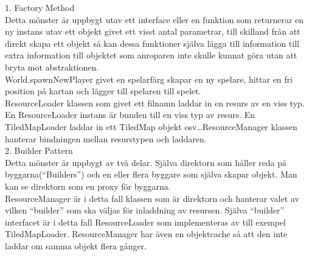 \vspace{11pt}
1. Factory Method\\
Detta mönster är uppbygt utav ett interface eller en funktion som returnerar en ny instans utav ett objekt givet ett visst antal parametrar, till skilland från att direkt skapa ett objekt så kan dessa funktioner själva lägga till information till extra information till objektet som anroparen inte skulle kunnat göra utan att bryta mot abstraktionen.\\
World.spawnNewPlayer givet en spelarfärg skapar en ny spelare, hittar en fri position på kartan och lägger till spelaren till spelet.\\
ResourceLoader klassen som givet ett filnamn laddar in en resurs av en viss typ. En ResourceLoader instans är bunden till en viss typ av resurs. En TiledMapLoader laddar in ett TiledMap objekt osv\ldots ResourceManager klassen hanterar bindningen mellan resurstypen och laddaren.\\
\vspace{11pt}
2. Builder Pattern\\
Detta mönster är uppbygt av två delar. Själva direktorn som håller reda på byggarna(``Builders'') och en eller flera byggare som själva skapar objekt. Man kan se direktorn som en proxy för byggarna.\\
ResourceManager är i detta fall klassen som är direktorn och hanterar valet av vilken ``builder'' som ska väljas för inladdning av resursen. Själva ``builder'' interfacet är i detta fall ResourceLoader som implementeras av till exempel TiledMapLoader. ResourceManager har även en objektcache så att den inte laddar om samma objekt flera gånger.\\

